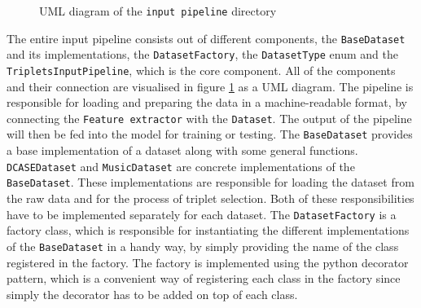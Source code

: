 \begin{figure}[ht]
{
    }
	\caption{UML diagram of the \texttt{input pipeline} directory}
	\label{fig:UML-Input-Pipeline}
\end{figure}
\noindent
The entire input pipeline consists out of different components, the \texttt{BaseDataset} and its implementations, the \texttt{DatasetFactory}, the \texttt{DatasetType} enum and the \texttt{TripletsInputPipeline}, which is the core component. All of the components and their connection are visualised in figure \ref{fig:UML-Input-Pipeline} as a UML diagram. The pipeline is responsible for loading and preparing the data in a machine-readable format, by connecting the \texttt{Feature extractor} with the \texttt{Dataset}. The output of the pipeline will then be fed into the model for training or testing.
\newline
\newline
The \texttt{BaseDataset} provides a base implementation of a dataset along with some general functions. \texttt{DCASEDataset} and \texttt{MusicDataset} are concrete implementations of the \texttt{BaseDataset}. These implementations are responsible for loading the dataset from the raw data and for the process of triplet selection. Both of these responsibilities have to be implemented separately for each dataset. The \texttt{DatasetFactory} is a factory class, which is responsible for instantiating the different implementations of the \texttt{BaseDataset} in a handy way, by simply providing the name of the class registered in the factory. The factory is implemented using the python decorator pattern, which is a convenient way of registering each class in the factory since simply the decorator has to be added on top of each class.

